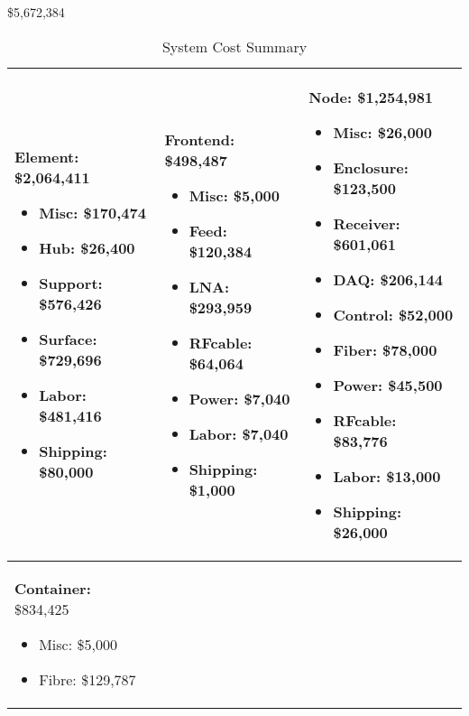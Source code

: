\$5,672,384

\begin{table}[t]
\centering
\caption{System Cost Summary}
\label{tab:budgetsummary}
\begin{tabular}{| p{2in} | p{2in} | p{2in} | }\\ \hline
\noindent
\textbf{Element:}  \$2,064,411
\begin{itemize}[parsep=-2pt, itemsep=-3pt]
\item Misc:   \$170,474
\item Hub:   \$26,400
\item Support:   \$576,426
\item Surface:   \$729,696
\item Labor:   \$481,416
\item Shipping:   \$80,000
\end{itemize}
 &
 \noindent
\textbf{Frontend:}  \$498,487
\begin{itemize}[parsep=-2pt, itemsep=-3pt]
\item Misc:   \$5,000
\item Feed:   \$120,384
\item LNA:   \$293,959
\item RFcable:   \$64,064
\item Power:   \$7,040
\item Labor:   \$7,040
\item Shipping:   \$1,000
\end{itemize}
 &
 \noindent
\textbf{Node:}  \$1,254,981
\begin{itemize}[parsep=-2pt, itemsep=-3pt]
\item Misc:   \$26,000
\item Enclosure:   \$123,500
\item Receiver:   \$601,061
\item DAQ:   \$206,144
\item Control:   \$52,000
\item Fiber:   \$78,000
\item Power:   \$45,500
\item RFcable:   \$83,776
\item Labor:   \$13,000
\item Shipping:   \$26,000
\end{itemize}
\\ \hline
\noindent
\textbf{Container:}  \$834,425
\begin{itemize}[parsep=-2pt, itemsep=-3pt]
\item Misc:   \$5,000
\item Fibre:   \$129,787

\end{itemize}
\end{tabular}
\end{table}
